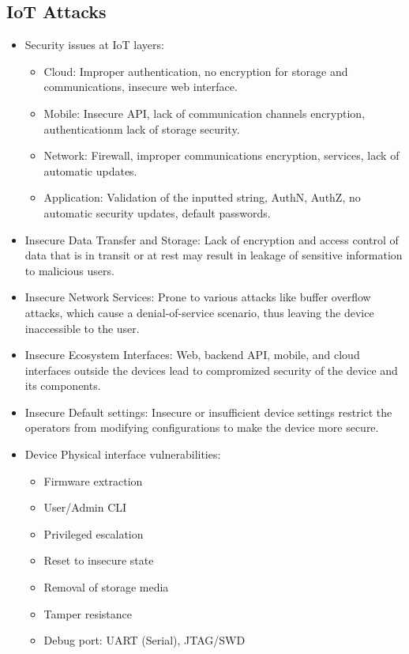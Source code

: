 \subsection{IoT Attacks}
\begin{itemize}
    \item Security issues at IoT layers:
    \begin{itemize}
        \item Cloud: Improper authentication, no encryption for storage and communications, insecure web interface.
        \item Mobile: Insecure API, lack of communication channels encryption, authenticationm lack of storage security.
        \item Network: Firewall, improper communications encryption, services, lack of automatic updates.
        \item Application: Validation of the inputted string, AuthN, AuthZ, no automatic security updates, default passwords.
    \end{itemize}
    \item Insecure Data Transfer and Storage: Lack of encryption and access control of data that is in transit or at rest may result in leakage of sensitive information to malicious users.
    \item Insecure Network Services: Prone to various attacks like buffer overflow attacks, which cause a denial-of-service scenario, thus leaving the device inaccessible to the user.
    \item Insecure Ecosystem Interfaces: Web, backend API, mobile, and cloud interfaces outside the devices lead to compromized security of the device and its components.
    \item Insecure Default settings: Insecure or insufficient device settings restrict the operators from modifying configurations to make the device more secure.
    \item Device Physical interface vulnerabilities:
    \begin{itemize}
        \item Firmware extraction
        \item User/Admin CLI
        \item Privileged escalation
        \item Reset to insecure state
        \item Removal of storage media
        \item Tamper resistance
        \item Debug port: UART (Serial), JTAG/SWD

\end{itemize}
\end{itemize}
